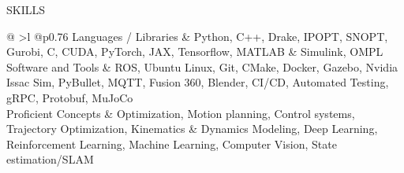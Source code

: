 \documentclass{resume} %
\begin{document}
\begin{rSection}{SKILLS}
	\begin{tabular}{ @ {} >{\bfseries}l @{\hspace{3ex}}p{0.76\textwidth}}
		Languages / Libraries & Python, C++, Drake, IPOPT, SNOPT, Gurobi, C, CUDA, PyTorch, JAX, Tensorflow, MATLAB \& Simulink, OMPL                                                                                                     \\
		Software and Tools    & ROS, Ubuntu Linux, Git, CMake, Docker, Gazebo, Nvidia Issac Sim, PyBullet, MQTT,
		Fusion 360, Blender, CI/CD, Automated Testing, gRPC, Protobuf, MuJoCo                                                                                                                                                             \\
		Proficient Concepts   & Optimization, Motion planning, Control systems, Trajectory Optimization, Kinematics \& Dynamics Modeling, Deep Learning, Reinforcement Learning, Machine Learning, Computer Vision, State estimation/SLAM \\
	\end{tabular}
\end{rSection}

\vspace{-3mm}
\end{document}
